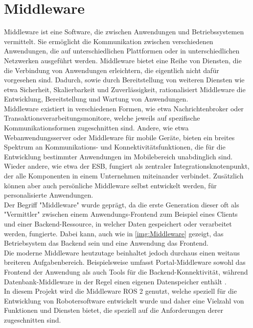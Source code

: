 \section{Middleware}\label{sec:Middleware}
Middleware ist eine Software, die zwischen Anwendungen und Betriebssystemen vermittelt. Sie ermöglicht die Kommunikation zwischen verschiedenen Anwendungen, die auf unterschiedlichen Plattformen oder in unterschiedlichen Netzwerken ausgeführt werden. Middleware bietet eine Reihe von Diensten, die die Verbindung von Anwendungen erleichtern, die eigentlich nicht dafür vorgesehen sind. Dadurch, sowie durch Bereitstellung von weiteren Diensten wie etwa Sicherheit, Skalierbarkeit und Zuverlässigkeit, rationalisiert Middleware die Entwicklung, Bereitstellung und Wartung von Anwendungen.\\
Middleware existiert in verschiedenen Formen, wie etwa Nachrichtenbroker oder Transaktionsverarbeitungsmonitore, welche jeweils auf spezifische Kommunikationsformen zugeschnitten sind. Andere, wie etwa Webanwendungsserver oder Middleware für mobile Geräte, bieten ein breites Spektrum an Kommunikations- und Konnektivitätsfunktionen, die für die Entwicklung bestimmter Anwendungen im Mobilebereich unabdinglich sind. Wieder andere, wie etwa der \ac{ESB}, fungiert als zentraler Integrationsknotenpunkt, der alle Komponenten in einem Unternehmen miteinander verbindet. Zusätzlich können aber auch persönliche Middleware selbst entwickelt werden, für personalisierte Anwendungen.\\
Der Begriff "Middleware" wurde geprägt, da die erste Generation dieser oft als "Vermittler" zwischen einem Anwendungs-Frontend zum Beispiel eines Clients und einer Backend-Ressource, in welcher Daten gespeichert oder verarbeitet werden, fungierte. Dabei kann, auch wie in \autoref{img:Middleware} gezeigt, das Betriebsystem das Backend sein und eine Anwendung das Frontend.\\
Die moderne Middleware heutzutage beinhaltet jedoch durchaus einen weitaus breiteren Aufgabenbereich. Beispielsweise umfasst Portal-Middleware sowohl das Frontend der Anwendung als auch Tools für die Backend-Konnektivität, während Datenbank-Middleware in der Regel einen eigenen Datenspeicher enthält \cite{AzureMiddleware}.\\
In diesem Projekt wird die Middleware \ac{ROS} 2 genutzt, welche speziell für die Entwicklung von Robotersoftware entwickelt wurde und daher eine Vielzahl von Funktionen und Diensten bietet, die speziell auf die Anforderungen derer zugeschnitten sind.\\

